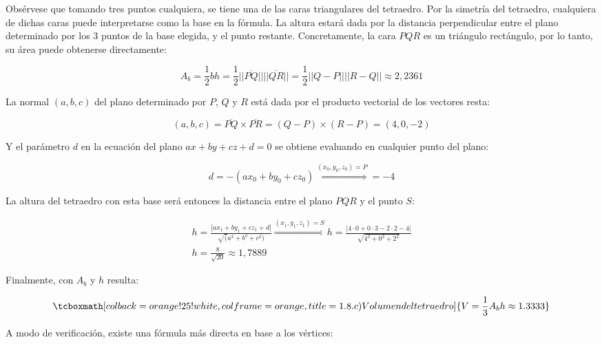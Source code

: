 \documentclass{article}
\begin{document}
Obsérvese que tomando tres puntos cualquiera, se tiene una de las caras triangulares del tetraedro. Por la simetría del tetraedro, cualquiera de dichas caras puede interpretarse como la base en la fórmula. La altura estará dada por la distancia perpendicular entre el plano determinado por los 3 puntos de la base elegida, y el punto restante. Concretamente, la cara $PQR$ es un triángulo rectángulo, por lo tanto, su área puede obtenerse directamente:

\begin{equation}
A_b = \frac{1}{2} b h = \frac{1}{2} ||\overline{PQ}|| ||\overline{QR}|| = \frac{1}{2} ||Q-P|| ||R-Q|| \approx 2,2361
\end{equation}

La normal $(a,b,c)$ del plano determinado por $P$, $Q$ y $R$ está dada por el producto vectorial de los vectores resta:

\begin{equation}
(a,b,c) = \overline{PQ} \times \overline{PR} = (Q-P) \times (R-P) = (4, 0, -2)
\end{equation}

Y el parámetro $d$ en la ecuación del plano $a x + b y + c z + d = 0$ se obtiene evaluando en cualquier punto del plano:

\begin{equation}
d = -(a x_0 + b y_0 + c z_0) \overset{(x_0, y_0, z_0) = P}{\Rightarrow} = -4
\end{equation}

La altura del tetraedro con esta base será entonces la distancia entre el plano $PQR$ y el punto $S$:

\begin{subequations}
\begin{align}
h = \frac{|a x_1 + b y_1 + c z_1 + d|}{\sqrt(a^2 + b^2 + c^2)} \overset{(x_1, y_1, z_1) = S}{\Longrightarrow} h = \frac{|4 \cdot 0 + 0 \cdot 3 -2 \cdot 2 -4|}{\sqrt{4^2 + 0^2 + 2^2}} \\
h = \frac{8}{\sqrt{20}} \approx 1,7889
\end{align}
\end{subequations}

Finalmente, con $A_b$ y $h$ resulta:

\begin{equation}
\tcboxmath[colback=orange!25!white,colframe=orange, title=1.8.c) Volumen del tetraedro]
{ V = \frac{1}{3} A_b h \approx 1.3333 }
\end{equation}

A modo de verificación, existe una fórmula más directa en base a los vértices:
\end{document}
